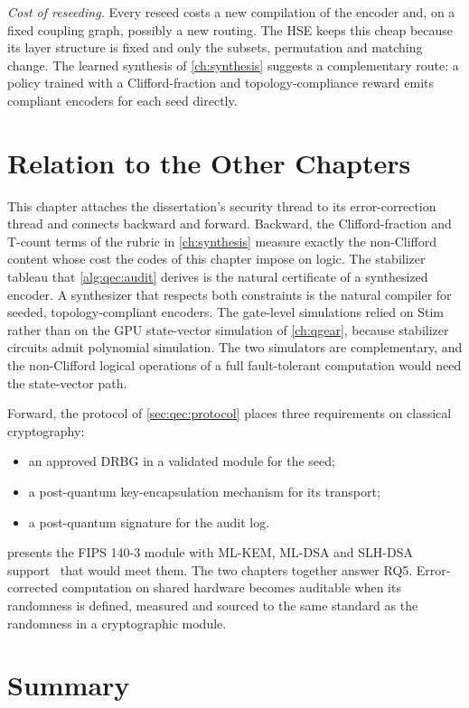 \emph{Cost of reseeding.} Every reseed costs a new compilation of the encoder and, on a fixed coupling graph, possibly a new routing. The HSE keeps this cheap because its layer structure is fixed and only the subsets, permutation and matching change. The learned synthesis of \cref{ch:synthesis} suggests a complementary route: a policy trained with a Clifford-fraction and topology-compliance reward emits compliant encoders for each seed directly.

\section{Relation to the Other Chapters}\label{sec:qec:relation}

This chapter attaches the dissertation's security thread to its error-correction thread and connects backward and forward. Backward, the Clifford-fraction and T-count terms of the \rubriq{} rubric in \cref{ch:synthesis} measure exactly the non-Clifford content whose cost the codes of this chapter impose on logic. The stabilizer tableau that \cref{alg:qec:audit} derives is the natural certificate of a synthesized encoder. A synthesizer that respects both constraints is the natural compiler for seeded, topology-compliant encoders. The gate-level simulations relied on Stim rather than on the GPU state-vector simulation of \cref{ch:qgear}, because stabilizer circuits admit polynomial simulation. The two simulators are complementary, and the non-Clifford logical operations of a full fault-tolerant computation would need the state-vector path.

Forward, the protocol of \cref{sec:qec:protocol} places three requirements on classical cryptography:
\begin{itemize}
  \item an approved DRBG in a validated module for the seed;
  \item a post-quantum key-encapsulation mechanism for its transport;
  \item a post-quantum signature for the audit log.
\end{itemize}
 presents the FIPS 140-3 module with ML-KEM, ML-DSA and SLH-DSA support~\cite{guo2026lightriderqpc} that would meet them. The two chapters together answer RQ5. Error-corrected computation on shared hardware becomes auditable when its randomness is defined, measured and sourced to the same standard as the randomness in a cryptographic module.

\section{Summary}\label{sec:qec:summary}

